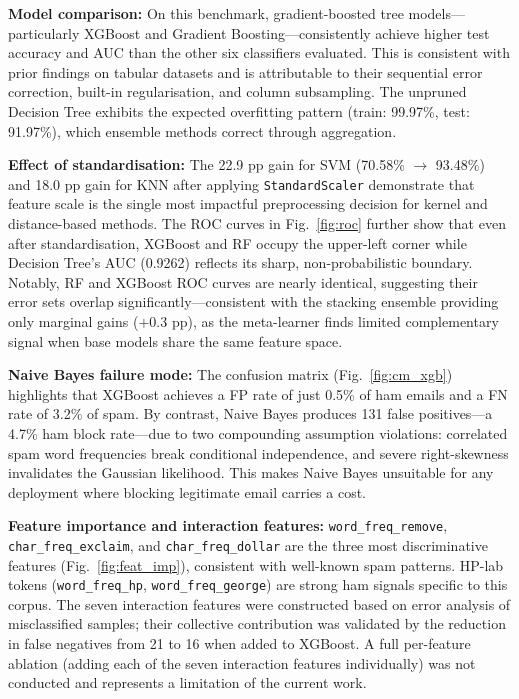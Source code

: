 \documentclass[conference]{IEEEtran}
\begin{document}
\textbf{Model comparison:} On this benchmark, gradient-boosted tree models---particularly XGBoost and Gradient Boosting---consistently achieve higher test accuracy and AUC than the other six classifiers evaluated. This is consistent with prior findings on tabular datasets and is attributable to their sequential error correction, built-in regularisation, and column subsampling. The unpruned Decision Tree exhibits the expected overfitting pattern (train: 99.97\%, test: 91.97\%), which ensemble methods correct through aggregation.

\textbf{Effect of standardisation:} The 22.9 pp gain for SVM (70.58\% $\to$ 93.48\%) and 18.0 pp gain for KNN after applying \texttt{StandardScaler} demonstrate that feature scale is the single most impactful preprocessing decision for kernel and distance-based methods. The ROC curves in Fig.~\ref{fig:roc} further show that even after standardisation, XGBoost and RF occupy the upper-left corner while Decision Tree's AUC (0.9262) reflects its sharp, non-probabilistic boundary. Notably, RF and XGBoost ROC curves are nearly identical, suggesting their error sets overlap significantly---consistent with the stacking ensemble providing only marginal gains ($+0.3$ pp), as the meta-learner finds limited complementary signal when base models share the same feature space.

\textbf{Naive Bayes failure mode:} The confusion matrix (Fig.~\ref{fig:cm_xgb}) highlights that XGBoost achieves a FP rate of just 0.5\% of ham emails and a FN rate of 3.2\% of spam. By contrast, Naive Bayes produces 131 false positives---a 4.7\% ham block rate---due to two compounding assumption violations: correlated spam word frequencies break conditional independence, and severe right-skewness invalidates the Gaussian likelihood. This makes Naive Bayes unsuitable for any deployment where blocking legitimate email carries a cost.

\textbf{Feature importance and interaction features:} \texttt{word\_freq\_remove}, \texttt{char\_freq\_exclaim}, and \texttt{char\_freq\_dollar} are the three most discriminative features (Fig.~\ref{fig:feat_imp}), consistent with well-known spam patterns. HP-lab tokens (\texttt{word\_freq\_hp}, \texttt{word\_freq\_george}) are strong ham signals specific to this corpus. The seven interaction features were constructed based on error analysis of misclassified samples; their collective contribution was validated by the reduction in false negatives from 21 to 16 when added to XGBoost. A full per-feature ablation (adding each of the seven interaction features individually) was not conducted and represents a limitation of the current work.
\end{document}
